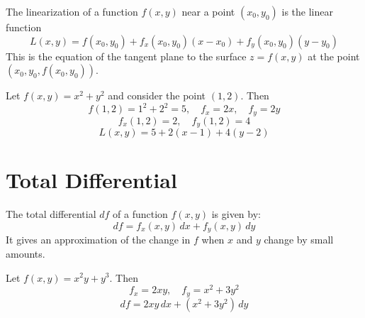 \begin{definition}[Linearization]
  \label{def:linearization-3d}
  The linearization of a function \( f(x, y) \) near a point \( (x_0, y_0) \) is the linear function
  \[
    L(x, y) = f(x_0, y_0) + f_x(x_0, y_0)(x - x_0) + f_y(x_0, y_0)(y - y_0)
  \]
  This is the equation of the tangent plane to the surface \( z = f(x, y) \) at the point \( (x_0, y_0, f(x_0, y_0)) \).
\end{definition}

\begin{eg}
  Let \( f(x, y) = x^2 + y^2 \) and consider the point \( (1, 2) \). Then
  \[
    f(1, 2) = 1^2 + 2^2 = 5,\quad f_x = 2x,\quad f_y = 2y
  \]
  \[
    f_x(1,2) = 2,\quad f_y(1,2) = 4
  \]
  \[
    L(x, y) = 5 + 2(x - 1) + 4(y - 2)
  \]
\end{eg}

\section{Total Differential}

\begin{definition}
  \label{def:total-diff}
  The total differential \( df \) of a function \( f(x, y) \) is given by:
  \[
    df = f_x(x, y)\,dx + f_y(x, y)\,dy
  \]
  It gives an approximation of the change in \( f \) when \( x \) and \( y \) change by small amounts.
\end{definition}

\begin{eg}
  Let \( f(x, y) = x^2y + y^3 \). Then
  \[
    f_x = 2xy,\quad f_y = x^2 + 3y^2
  \]
  \[
    df = 2xy\,dx + (x^2 + 3y^2)\,dy
  \]
\end{eg}
